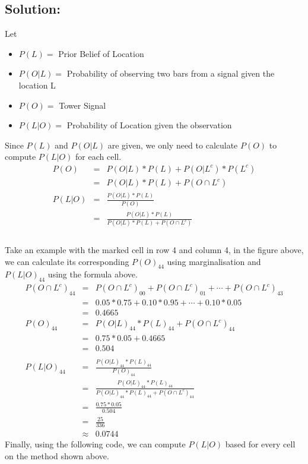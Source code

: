 \documentclass[12pt]{article}%
\begin{document}
\subsection*{Solution:}
Let 
\begin{itemize}
\item $P(L) = $ Prior Belief of Location
\item $P(O|L) = $ Probability of observing two bars from a signal given the location L
\item $P(O) = $ Tower Signal
\item $P(L|O) = $ Probability of Location given the observation \\
\end{itemize} 
Since $P(L)$ and $P(O|L)$ are given, we only need to calculate $P(O)$ to compute $P(L|O)$ for each cell.
\begin{eqnarray*}
P(O) & = & P(O|L) * P(L) + P(O|L^c) * P(L^c)\\
	 & = & P(O|L) * P(L) + P(O \cap L^c) \\
P(L|O) & = &\frac{P(O|L)*P(L)}{P(O)} \\
	   & = &\frac{P(O|L)*P(L)}{P(O|L) * P(L) + P(O \cap L^c)} \\
\end{eqnarray*} \\
Take an example with the marked cell in row 4 and column 4, in the figure above, we can calculate its corresponding $P(O)_{44}$ using marginalisation and $P(L|O)_{44}$ using the formula above. 
\begin{eqnarray*}
P(O \cap L^c)_{44} & = & P(O \cap L^c)_{00} + P(O \cap L^c)_{01} + \cdots + P(O \cap L^c)_{43} \\
& = & 0.05 * 0.75 + 0.10 * 0.95 + \cdots + 0.10 * 0.05 \\
& = & 0.4665 \\
P(O)_{44} & = & P(O|L)_{44} * P(L)_{44} + P(O \cap L^c)_{44} \\
	 & = & 0.75 * 0.05 + 0.4665 \\
	 & = & 0.504 \\ \\
P(L|O)_{44} & = &\frac{P(O|L)_{44}*P(L)_{44}}{P(O)_{44}} \\
	   & = &\frac{P(O|L)_{44}*P(L)_{44}}{P(O|L)_{44} * P(L)_{44} + P(O \cap L^c)_{44}} \\
	   & = &\frac{0.75 * 0.05}{0.504} \\
	   & = &\frac{25}{336} \\
	   & \approx & 0.0744	  
\end{eqnarray*} 
Finally, using the following code, we can compute $P(L|O)$ based for every cell on the method shown above. 
\newpage
\end{document}

